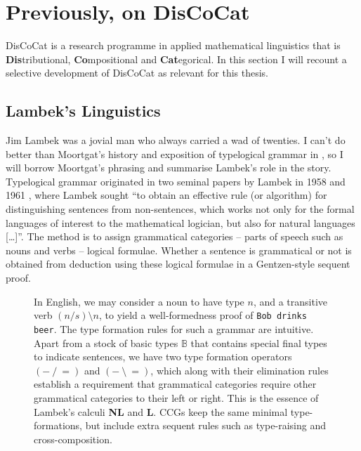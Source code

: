 \section{Previously, on DisCoCat}\label{sec:previously}

DisCoCat is a research programme in applied mathematical linguistics that is \textbf{Dis}tributional, \textbf{Co}mpositional and \textbf{Cat}egorical. In this section I will recount a selective development of DisCoCat as relevant for this thesis.

\subsection{Lambek's Linguistics}

Jim Lambek was a jovial man who always carried a wad of twenties. I can't do better than Moortgat's history and exposition of typelogical grammar in \citep{moortgat_typelogical_2014}, so I will borrow Moortgat's phrasing and summarise Lambek's role in the story. Typelogical grammar originated in two seminal papers by Lambek in 1958 \citep{lambek_mathematics_1958} and 1961 \citep{jakobson_calculus_1961}, where Lambek sought “to obtain an effective rule (or algorithm) for distinguishing sentences from non-sentences, which works not only for the formal languages of interest to the mathematical logician, but also for natural languages […]”. The method is to assign grammatical categories -- parts of speech such as nouns and verbs -- logical formulae. Whether a sentence is grammatical or not is obtained from deduction using these logical formulae in a Gentzen-style sequent proof.

\begin{figure}[h!]
\centering
{}
\caption{In English, we may consider a noun to have type $n$, and a transitive verb $(n/s)\setminus n$, to yield a well-formedness proof of \texttt{Bob drinks beer}. The type formation rules for such a grammar are intuitive. Apart from a stock of basic types $\mathbb{B}$ that contains special final types to indicate sentences, we have two type formation operators $(- \ / \ =)$ and $(- \ \setminus \ =)$, which along with their elimination rules establish a requirement that grammatical categories require other grammatical categories to their left or right. This is the essence of Lambek's calculi \textbf{NL} and \textbf{L}. CCGs keep the same minimal type-formations, but include extra sequent rules such as type-raising and cross-composition.}
\end{figure}

